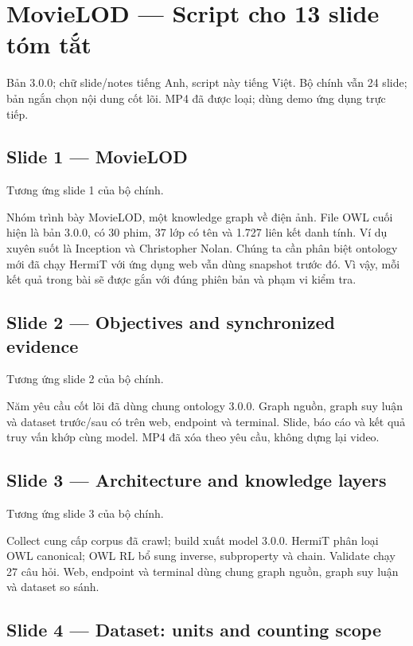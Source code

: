 \documentclass[
  11pt,
]{article}
\author{}
\date{}
\begin{document}
\section{MovieLOD --- Script cho 13 slide tóm
tắt}\label{movielod-script-cho-13-slide-tuxf3m-tux1eaft}

Bản 3.0.0; chữ slide/notes tiếng Anh, script này tiếng Việt. Bộ chính
vẫn 24 slide; bản ngắn chọn nội dung cốt lõi. MP4 đã được loại; dùng
demo ứng dụng trực tiếp.

\subsection{Slide 1 --- MovieLOD}\label{slide-1-movielod}

Tương ứng slide 1 của bộ chính.

Nhóm trình bày MovieLOD, một knowledge graph về điện ảnh. File OWL cuối
hiện là bản 3.0.0, có 30 phim, 37 lớp có tên và 1.727 liên kết danh
tính. Ví dụ xuyên suốt là Inception và Christopher Nolan. Chúng ta cần
phân biệt ontology mới đã chạy HermiT với ứng dụng web vẫn dùng snapshot
trước đó. Vì vậy, mỗi kết quả trong bài sẽ được gắn với đúng phiên bản
và phạm vi kiểm tra.

\subsection{Slide 2 --- Objectives and synchronized
evidence}\label{slide-2-objectives-and-synchronized-evidence}

Tương ứng slide 2 của bộ chính.

Năm yêu cầu cốt lõi đã dùng chung ontology 3.0.0. Graph nguồn, graph suy
luận và dataset trước/sau có trên web, endpoint và terminal. Slide, báo
cáo và kết quả truy vấn khớp cùng model. MP4 đã xóa theo yêu cầu, không
dựng lại video.

\subsection{Slide 3 --- Architecture and knowledge
layers}\label{slide-3-architecture-and-knowledge-layers}

Tương ứng slide 3 của bộ chính.

Collect cung cấp corpus đã crawl; build xuất model 3.0.0. HermiT phân
loại OWL canonical; OWL RL bổ sung inverse, subproperty và chain.
Validate chạy 27 câu hỏi. Web, endpoint và terminal dùng chung graph
nguồn, graph suy luận và dataset so sánh.

\subsection{Slide 4 --- Dataset: units and counting
scope}\label{slide-4-dataset-units-and-counting-scope}
\end{document}
